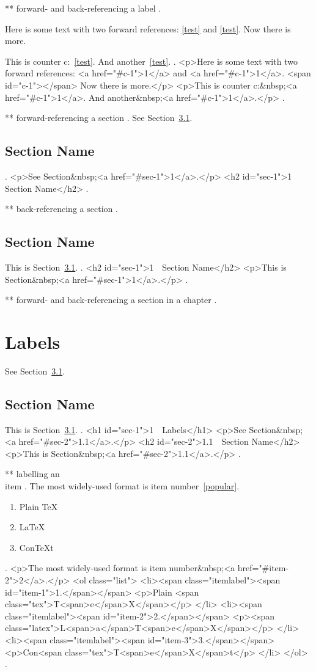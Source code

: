 ** forward- and back-referencing a label
.

Here is some text with two forward references: \ref{test} and \ref{test}.
Now there is more.

This \label{test} is counter c:~\ref{test}. And another~\ref{test}.
.
<p>Here is some text with two forward references: <a href="#c-1">1</a> and <a href="#c-1">1</a>. <span id="c-1"></span> Now there is more.</p>
<p>This  is counter c:&nbsp;<a href="#c-1">1</a>. And another&nbsp;<a href="#c-1">1</a>.</p>
.


** forward-referencing a section
.
See Section~\ref{sec:test}.

\section{Section Name}
\label{sec:test}
.
<p>See Section&nbsp;<a href="#sec-1">1</a>.</p>
<h2 id="sec-1">1 Section Name</h2>
.


** back-referencing a section
.
\section{Section Name}

This \label{sec:test} is Section~\ref{sec:test}.
.
<h2 id="sec-1">1 Section Name</h2>
<p>This  is Section&nbsp;<a href="#sec-1">1</a>.</p>
.


** forward- and back-referencing a section in a chapter
.
\chapter{Labels}

See Section~\ref{sec:test}.

\section{Section Name}
\label{sec:test}
This is Section~\ref{sec:test}.
.
<h1 id="sec-1">1 Labels</h1>
<p>See Section&nbsp;<a href="#sec-2">1.1</a>.</p>
<h2 id="sec-2">1.1 Section Name</h2>
<p>This is Section&nbsp;<a href="#sec-2">1.1</a>.</p>
.


** labelling an \\item
.
The most widely-used format is item number~\ref{popular}.
\begin{enumerate}
    \item Plain \TeX
    \item \label{popular} \LaTeX
    \item Con\TeX t
\end{enumerate}
.
<p>The most widely‐used format is item number&nbsp;<a href="#item-2">2</a>.</p>
<ol class="list">
<li><span class="itemlabel"><span id="item-1">1.</span></span>
<p>Plain <span class="tex">T<span>e</span>X</span></p>
</li>
<li><span class="itemlabel"><span id="item-2">2.</span></span>
<p><span class="latex">L<span>a</span>T<span>e</span>X</span></p>
</li>
<li><span class="itemlabel"><span id="item-3">3.</span></span>
<p>Con<span class="tex">T<span>e</span>X</span>t</p>
</li>
</ol>
.



